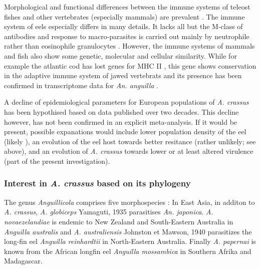 Morphological and functional differences between the immune systems of
teleost fishes and other vertebrates (especially mammals) are
prevalent \cite{press1999morphology}. The immune system of eels
especially differs in many details. It lacks all but the M-class of
antibodies and response to macro-parasites is carried out mainly by
neutrophile rather than eosinophile granulocytes
\cite{nielsen_eel_2006}. However, the immune systems of mammals and
fish also show some genetic, molecular and cellular similarity. While
for example the atlantic cod has lost genes for MHC II
\cite{pmid21832995}, this gene shows conservation in the adaptive
immune system of jawed vertebrats \cite{pmid21078341} and its presence
has been confirmed in transcriptome data for \textit{An. anguilla}
\cite{pmid17666525}.

A decline of epidemiological parameters for European populations of
\textit{A. crassus} has been hypothised based on data published over
two decades. This decline however, has not been confirmed in an
explicit meta-analysis. If it would be present, possible expanations
would include lower population density of the eel (likely
\cite{schabuss_dynamics_2005}), an evolution of the eel host towards
better resitance (rather unlikely; see above), and an evolution of
\textit{A. crassus} towards lower or at least altered virulence (part
of the present investigation).

\subsubsection{Interest in \textit{A. crassus} based on its
    phylogeny}
\label{phyl-int}

The genus \textit{Anguillicola} comprises five morphospecies
\cite{taraschewski_revision_1988}: In East Asia, in additon to
\textit{A. crassus}, \textit{A. globiceps} Yamaguti, 1935
\cite{yamaguti_globiceps} parasitises \textit{An.
  japonica}. \textit{A. novaezelandiae} is endemic to New Zealand and
South-Eastern Australia in \textit{Anguilla australis} and
\textit{A. australiensis} Johnston et Mawson, 1940
\cite{johnston1940some} parasitizes the long-fin eel \textit{Anguilla
  reinhardtii} in North-Eastern Australia. Finally
\textit{A. papernai} is known from the African longfin eel
\textit{Anguilla mossambica} in Southern Afrika and Madagascar.



